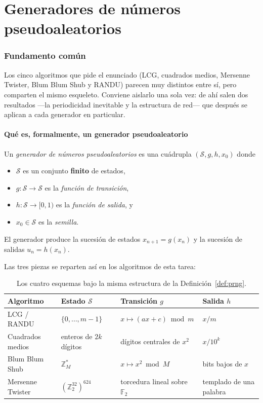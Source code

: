 \part{Generadores de números pseudoaleatorios}

\section{Fundamento común}
\label{sec:fundamento}

Los cinco algoritmos que pide el enunciado (LCG, cuadrados medios, Mersenne
Twister, Blum Blum Shub y RANDU) parecen muy distintos entre sí, pero comparten
el mismo esqueleto. Conviene aislarlo una sola vez: de ahí salen dos resultados
—la periodicidad inevitable y la estructura de red— que después se aplican a
cada generador en particular.

\subsection{Qué es, formalmente, un generador pseudoaleatorio}

\begin{definicion}
\label{def:prng}
Un \emph{generador de números pseudoaleatorios} es una cuádrupla
$(\mathcal{S}, g, h, x_0)$ donde
\begin{itemize}
  \item $\mathcal{S}$ es un conjunto \textbf{finito} de estados,
  \item $g : \mathcal{S} \to \mathcal{S}$ es la \emph{función de transición},
  \item $h : \mathcal{S} \to [0,1)$ es la \emph{función de salida}, y
  \item $x_0 \in \mathcal{S}$ es la \emph{semilla}.
\end{itemize}
El generador produce la sucesión de estados $x_{n+1} = g(x_n)$ y la sucesión de
salidas $u_n = h(x_n)$.
\end{definicion}

Las tres piezas se reparten así en los algoritmos de esta tarea:

\begin{table}[H]
\centering
\small
\begin{tabularx}{\textwidth}{l L L L}
\toprule
Algoritmo & Estado $\mathcal{S}$ & Transición $g$ & Salida $h$ \\
\midrule
LCG / RANDU & $\{0,\dots,m-1\}$ & $x \mapsto (ax+c) \bmod m$ & $x/m$ \\
Cuadrados medios & enteros de $2k$ dígitos & dígitos centrales de $x^2$ & $x/10^{k}$ \\
Blum Blum Shub & $\mathbb{Z}_M^{*}$ & $x \mapsto x^2 \bmod M$ & bits bajos de $x$ \\
Mersenne Twister & $(\mathbb{Z}_2^{32})^{624}$ & torcedura lineal sobre $\mathbb{F}_2$ & templado de una palabra \\
\bottomrule
\end{tabularx}
\caption{Los cuatro esquemas bajo la misma estructura de la
Definición~\ref{def:prng}.}
\label{tab:esqueleto}
\end{table}

